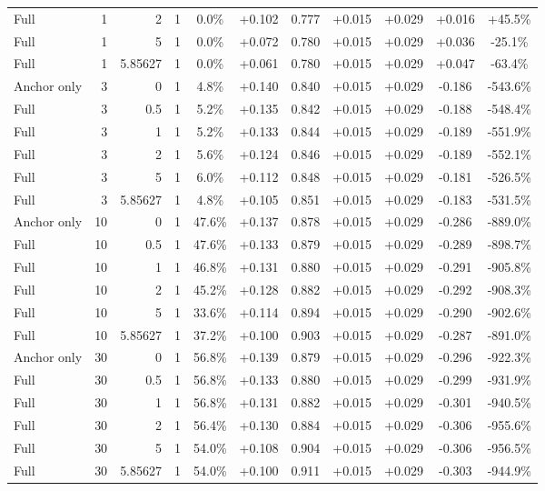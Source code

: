 \begin{table}[htbp]
\begin{tabular}{lrrrccccccc}
Full & 1 & 2 & 1 & 0.0\% & +0.102 & 0.777 & +0.015 & +0.029 & +0.016 & +45.5\% \\
Full & 1 & 5 & 1 & 0.0\% & +0.072 & 0.780 & +0.015 & +0.029 & +0.036 & -25.1\% \\
Full & 1 & 5.85627 & 1 & 0.0\% & +0.061 & 0.780 & +0.015 & +0.029 & +0.047 & -63.4\% \\
Anchor only & 3 & 0 & 1 & 4.8\% & +0.140 & 0.840 & +0.015 & +0.029 & -0.186 & -543.6\% \\
Full & 3 & 0.5 & 1 & 5.2\% & +0.135 & 0.842 & +0.015 & +0.029 & -0.188 & -548.4\% \\
Full & 3 & 1 & 1 & 5.2\% & +0.133 & 0.844 & +0.015 & +0.029 & -0.189 & -551.9\% \\
Full & 3 & 2 & 1 & 5.6\% & +0.124 & 0.846 & +0.015 & +0.029 & -0.189 & -552.1\% \\
Full & 3 & 5 & 1 & 6.0\% & +0.112 & 0.848 & +0.015 & +0.029 & -0.181 & -526.5\% \\
Full & 3 & 5.85627 & 1 & 4.8\% & +0.105 & 0.851 & +0.015 & +0.029 & -0.183 & -531.5\% \\
Anchor only & 10 & 0 & 1 & 47.6\% & +0.137 & 0.878 & +0.015 & +0.029 & -0.286 & -889.0\% \\
Full & 10 & 0.5 & 1 & 47.6\% & +0.133 & 0.879 & +0.015 & +0.029 & -0.289 & -898.7\% \\
Full & 10 & 1 & 1 & 46.8\% & +0.131 & 0.880 & +0.015 & +0.029 & -0.291 & -905.8\% \\
Full & 10 & 2 & 1 & 45.2\% & +0.128 & 0.882 & +0.015 & +0.029 & -0.292 & -908.3\% \\
Full & 10 & 5 & 1 & 33.6\% & +0.114 & 0.894 & +0.015 & +0.029 & -0.290 & -902.6\% \\
Full & 10 & 5.85627 & 1 & 37.2\% & +0.100 & 0.903 & +0.015 & +0.029 & -0.287 & -891.0\% \\
Anchor only & 30 & 0 & 1 & 56.8\% & +0.139 & 0.879 & +0.015 & +0.029 & -0.296 & -922.3\% \\
Full & 30 & 0.5 & 1 & 56.8\% & +0.133 & 0.880 & +0.015 & +0.029 & -0.299 & -931.9\% \\
Full & 30 & 1 & 1 & 56.8\% & +0.131 & 0.882 & +0.015 & +0.029 & -0.301 & -940.5\% \\
Full & 30 & 2 & 1 & 56.4\% & +0.130 & 0.884 & +0.015 & +0.029 & -0.306 & -955.6\% \\
Full & 30 & 5 & 1 & 54.0\% & +0.108 & 0.904 & +0.015 & +0.029 & -0.306 & -956.5\% \\
Full & 30 & 5.85627 & 1 & 54.0\% & +0.100 & 0.911 & +0.015 & +0.029 & -0.303 & -944.9\% \\

\end{tabular}
\end{table}
